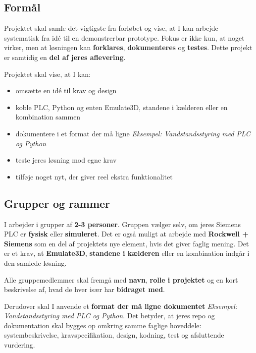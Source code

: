 \documentclass[12pt, a4paper]{article}
\begin{document}
\subsection{Formål}

Projektet skal samle det vigtigste fra forløbet og vise, at I kan arbejde
systematisk fra idé til en demonstrerbar prototype. Fokus er ikke kun, at noget virker,
men at løsningen kan \textbf{forklares}, \textbf{dokumenteres} og
\textbf{testes}. Dette projekt er samtidig en \textbf{del af jeres aflevering}.

\begin{tcolorbox}[infobox, title={\faInfoCircle\quad Hvad skal projektet vise?}]
Projektet skal vise, at I kan:
\begin{itemize}[leftmargin=1.2em, itemsep=2pt]
  \item omsætte en idé til krav og design
  \item koble PLC, Python og enten Emulate3D, standene i kælderen eller en kombination sammen
  \item dokumentere i et format der må ligne \textit{Eksempel: Vandstandsstyring med PLC og Python}
  \item teste jeres løsning mod egne krav
  \item tilføje noget nyt, der giver reel ekstra funktionalitet
\end{itemize}
\end{tcolorbox}

\subsection{Grupper og rammer}

I arbejder i grupper af \textbf{2-3 personer}. Gruppen vælger selv, om jeres
Siemens PLC er \textbf{fysisk} eller \textbf{simuleret}. Det er også muligt at
arbejde med \textbf{Rockwell + Siemens} som en del af projektets nye element,
hvis det giver faglig mening. Det er et krav, at \textbf{Emulate3D},
\textbf{standene i kælderen} eller en kombination indgår i den samlede løsning.

Alle gruppemedlemmer skal fremgå med \textbf{navn}, \textbf{rolle i projektet}
og en kort beskrivelse af, hvad de hver især har \textbf{bidraget med}.

Derudover skal I anvende et \textbf{format der må ligne dokumentet}
\textit{Eksempel: Vandstandsstyring med PLC og Python}. Det betyder, at jeres
repo og dokumentation skal bygges op omkring samme faglige hoveddele:
systembeskrivelse, kravspecifikation, design, kodning, test og afsluttende
vurdering.
\clearpage
\end{document}

